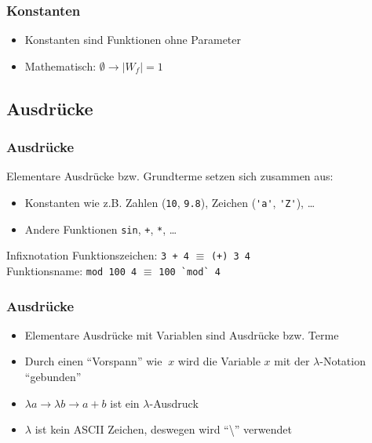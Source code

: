 \documentclass[fleqn,11pt,aspectratio=43]{beamer}
\begin{document}
\begin{frame}
\frametitle{Konstanten}
\begin{block}{\vspace*{-2ex}}
\begin{itemize}
  \item Konstanten sind Funktionen ohne Parameter
  \item Mathematisch: $\emptyset \to |W_f| = 1$
\end{itemize}
\end{block}
\end{frame}

\subsection{Ausdrücke}
\begin{frame}
\frametitle{Ausdrücke}
\begin{block}{\vspace*{-2ex}}
Elementare Ausdrücke bzw. Grundterme setzen sich zusammen aus:
\begin{itemize}
  \item Konstanten wie z.B. Zahlen (\lstinline|10|, \lstinline|9.8|), Zeichen (\lstinline|'a'|, \lstinline|'Z'|), \ldots
  \item Andere Funktionen \lstinline|sin|, \lstinline|+|, \lstinline|*|, \ldots
\end{itemize}
\end{block}
\begin{alertblock}{Infixnotation}
Funktionszeichen: \lstinline|3 + 4| $\equiv$ \lstinline|(+) 3 4|\\
Funktionsname: \lstinline|mod 100 4| $\equiv$ \lstinline|100 `mod` 4|
\end{alertblock}
\end{frame}

\begin{frame}
\frametitle{Ausdrücke}
\begin{block}{\vspace*{-2ex}}
\begin{itemize}
  \item Elementare Ausdrücke mit Variablen sind Ausdrücke bzw. Terme
  \item Durch einen "`Vorspann"' wie $\ x$ wird die Variable $x$ mit der $\lambda$-Notation "`gebunden"'
  \item $\lambda a \to \lambda b \to a + b$ ist ein $\lambda$-Ausdruck
  \item $\lambda$ ist kein ASCII Zeichen, deswegen wird "`\textbackslash"' verwendet 
\end{itemize}
\end{block}
\end{frame}
\end{document}
